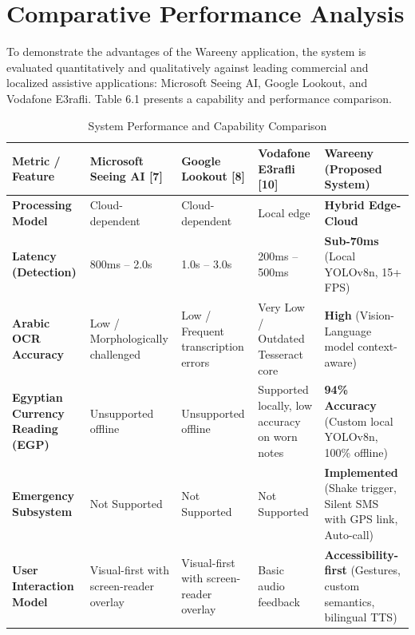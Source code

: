\documentclass[12pt,a4paper]{report}
\begin{document}
\section{Comparative Performance Analysis}
To demonstrate the advantages of the Wareeny application, the system is evaluated quantitatively and qualitatively against leading commercial and localized assistive applications: Microsoft Seeing AI, Google Lookout, and Vodafone E3rafli. Table 6.1 presents a capability and performance comparison.

\begin{table}[h]
\centering
\caption{System Performance and Capability Comparison}
\begin{tabularx}{\textwidth}{|>{\raggedright\arraybackslash}p{}|>{\raggedright\arraybackslash}p{}|>{\raggedright\arraybackslash}p{}|>{\raggedright\arraybackslash}p{}|>{\raggedright\arraybackslash}X|}
\hline
\textbf{Metric / Feature} & \textbf{Microsoft Seeing AI [7]} & \textbf{Google Lookout [8]} & \textbf{Vodafone E3rafli [10]} & \textbf{Wareeny (Proposed System)} \\
\hline
\textbf{Processing Model} & Cloud-dependent & Cloud-dependent & Local edge & \textbf{Hybrid Edge-Cloud} \\
\hline
\textbf{Latency (Detection)} & 800ms -- 2.0s & 1.0s -- 3.0s & 200ms -- 500ms & \textbf{Sub-70ms} (Local YOLOv8n, 15+ FPS) \\
\hline
\textbf{Arabic OCR Accuracy} & Low / Morphologically challenged & Low / Frequent transcription errors & Very Low / Outdated Tesseract core & \textbf{High} (Vision-Language model context-aware) \\
\hline
\textbf{Egyptian Currency Reading (EGP)} & Unsupported offline & Unsupported offline & Supported locally, low accuracy on worn notes & \textbf{94\% Accuracy} (Custom local YOLOv8n, 100\% offline) \\
\hline
\textbf{Emergency Subsystem} & Not Supported & Not Supported & Not Supported & \textbf{Implemented} (Shake trigger, Silent SMS with GPS link, Auto-call) \\
\hline
\textbf{User Interaction Model} & Visual-first with screen-reader overlay & Visual-first with screen-reader overlay & Basic audio feedback & \textbf{Accessibility-first} (Gestures, custom semantics, bilingual TTS) \\
\hline
\end{tabularx}
\end{table}
\end{document}
